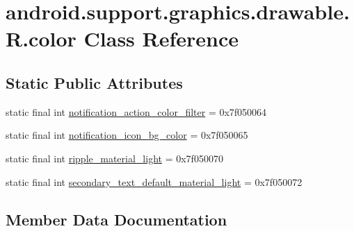 \hypertarget{classandroid_1_1support_1_1graphics_1_1drawable_1_1R_1_1color}{}\section{android.\+support.\+graphics.\+drawable.\+R.\+color Class Reference}
\label{classandroid_1_1support_1_1graphics_1_1drawable_1_1R_1_1color}
\subsection*{Static Public Attributes}
\begin{DoxyCompactItemize}
\item 
static final int \mbox{\hyperlink{classandroid_1_1support_1_1graphics_1_1drawable_1_1R_1_1color_a070312edeee48cdc7fe68bb6089c2044}{notification\+\_\+action\+\_\+color\+\_\+filter}} = 0x7f050064
\item 
static final int \mbox{\hyperlink{classandroid_1_1support_1_1graphics_1_1drawable_1_1R_1_1color_a1f9831c20e945d5290845da00d6edf8e}{notification\+\_\+icon\+\_\+bg\+\_\+color}} = 0x7f050065
\item 
static final int \mbox{\hyperlink{classandroid_1_1support_1_1graphics_1_1drawable_1_1R_1_1color_a508f091a5bc2b16ac3301a7bb4eaa6e8}{ripple\+\_\+material\+\_\+light}} = 0x7f050070
\item 
static final int \mbox{\hyperlink{classandroid_1_1support_1_1graphics_1_1drawable_1_1R_1_1color_a80596cd1d42bebf6c55a976d7ab49ee2}{secondary\+\_\+text\+\_\+default\+\_\+material\+\_\+light}} = 0x7f050072
\end{DoxyCompactItemize}


\subsection{Member Data Documentation}
\mbox{\label{classandroid_1_1support_1_1graphics_1_1drawable_1_1R_1_1color_a070312edeee48cdc7fe68bb6089c2044}} 
